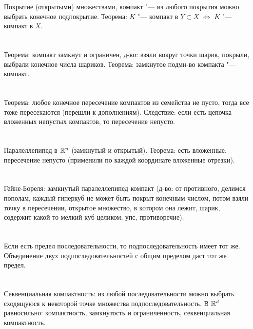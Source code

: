 \section{} %
Покрытие (открытыми) множествами, компакт "--- из любого покрытия можно выбрать конечное
подпокрытие. Теорема: $K$ "--- компакт в $Y \subset X$ $\iff$ $K$ "--- компакт в $X$.

\section{} %
Теорема: компакт замкнут и ограничен, д-во: взяли вокруг точки шарик, покрыли,
выбрали конечное числа шариков.
Теорема: замкнутое подмн-во компакта "--- компакт.

\section{} %
Теорема: любое конечное пересечение компактов из семейства не пусто, тогда все тоже
пересекаются (перешли к дополнениям).
Следствие: если есть цепочка вложенных непустых компактов, то пересечение непусто.

\section{} %
Паралеллепипед в $\mathbb{R}^n$ (замкнутый и открытый).
Теорема: есть вложенные, пересечение непусто (применили по каждой координате вложенные отрезки).

\section{} %
Гейне-Бореля: замкнутый паралеллепипед компакт (д-во: от противного, делимся пополам, каждый гиперкуб
не может быть покрыт конечным числом, потом взяли точку в пересечении, открытое множество, в котором
она лежит, шарик, содержит какой-то мелкий куб целиком, упс, противоречие).

\section{} %
Если есть предел последовательности, то подпоследовательность имеет тот же. Объединение
двух подпоследовательностей с общим пределом даст тот же предел.

\section{} %
Секвенциальная компактность: из любой последовательности можно выбрать сходящуюся к некоторой
точке множества подпоследовательность. В $\mathbb{R}^d$ равносильно: компактность, замкнутость
и ограниченность, секвенциальная компактность.

